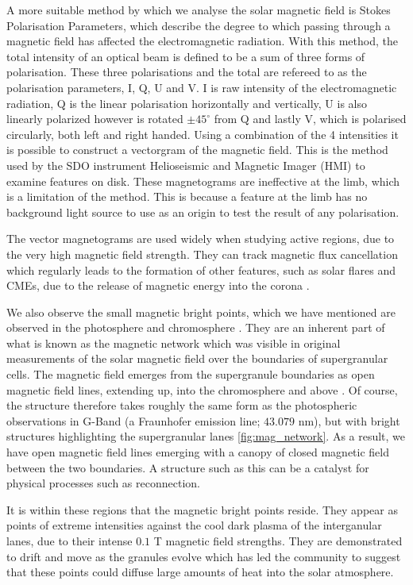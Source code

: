 A more suitable method by which we analyse the solar magnetic field is Stokes Polarisation Parameters, which describe the degree to which passing through a magnetic field has affected the electromagnetic radiation.
With this method, the total intensity of an optical beam is defined to be a sum of three forms of polarisation.
These three polarisations and the total are refereed to as the polarisation parameters, I, Q, U and V.
I is raw intensity of the electromagnetic radiation, Q is the linear polarisation horizontally and vertically, U is also linearly polarized however is rotated $\pm45^\circ$ from Q and lastly V, which is polarised circularly, both left and right handed.
Using a combination of the 4 intensities it is possible to construct a vectorgram of the magnetic field.
This is the method used by the SDO instrument Helioseismic and Magnetic Imager (HMI) to examine features on disk.
These magnetograms are ineffective at the limb, which is a limitation of the method.
This is because a feature at the limb has no background light source to use as an origin to test the result of any polarisation. 

The vector magnetograms are used widely when studying active regions, due to the very high magnetic field strength.
They can track magnetic flux cancellation which regularly leads to the formation of other features, such as solar flares and CMEs, due to the release of magnetic energy into the corona \cite{Welsch2006}.

We also observe the small magnetic bright points, which we have mentioned are observed in the photosphere and chromosphere \cite{SanchesAlmeida2010}.
They are an inherent part of what is known as the magnetic network which was visible in original measurements of the solar magnetic field over the boundaries of supergranular cells.
The magnetic field emerges from the supergranule boundaries as open magnetic field lines, extending up, into the chromosphere and above \citep{Hasan2005}.
Of course, the structure therefore takes roughly the same form as the photospheric observations in G-Band (a Fraunhofer emission line; $43.079$ nm), but with bright structures highlighting the supergranular lanes \ref{fig:mag_network}.
As a result, we have open magnetic field lines emerging with a canopy of closed magnetic field between the two boundaries.
A structure such as this can be a catalyst for physical processes such as reconnection.

It is within these regions that the magnetic bright points reside.
They appear as points of extreme intensities against the cool dark plasma of the interganular lanes, due to their intense $0.1$ T magnetic field strengths.
They are demonstrated to drift and move as the granules evolve \citep{Chitta2012} which has led the community to suggest that these points could diffuse large amounts of heat into the solar atmosphere.

